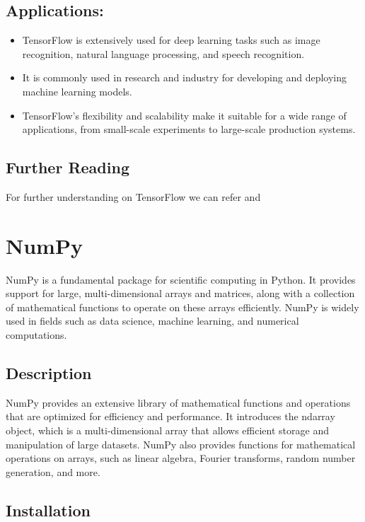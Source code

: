 \subsection{Applications:}

\begin{itemize}
	\item TensorFlow is extensively used for deep learning tasks such as image recognition, natural language processing, and speech recognition.
	\item It is commonly used in research and industry for developing and deploying machine learning models.
	\item TensorFlow's flexibility and scalability make it suitable for a wide range of applications, from small-scale experiments to large-scale production systems.
\end{itemize}

\subsection{Further Reading}

For further understanding on TensorFlow we can refer \cite{Khandelwal:2020} and \cite{Boesch:2022} 


\section{NumPy}

NumPy is a fundamental package for scientific computing in Python. It provides support for large, multi-dimensional arrays and matrices, along with a collection of mathematical functions to operate on these arrays efficiently. NumPy is widely used in fields such as data science, machine learning, and numerical computations.

\subsection{Description}

NumPy provides an extensive library of mathematical functions and operations that are optimized for efficiency and performance. It introduces the ndarray object, which is a multi-dimensional array that allows efficient storage and manipulation of large datasets. NumPy also provides functions for mathematical operations on arrays, such as linear algebra, Fourier transforms, random number generation, and more.

\subsection{Installation}

